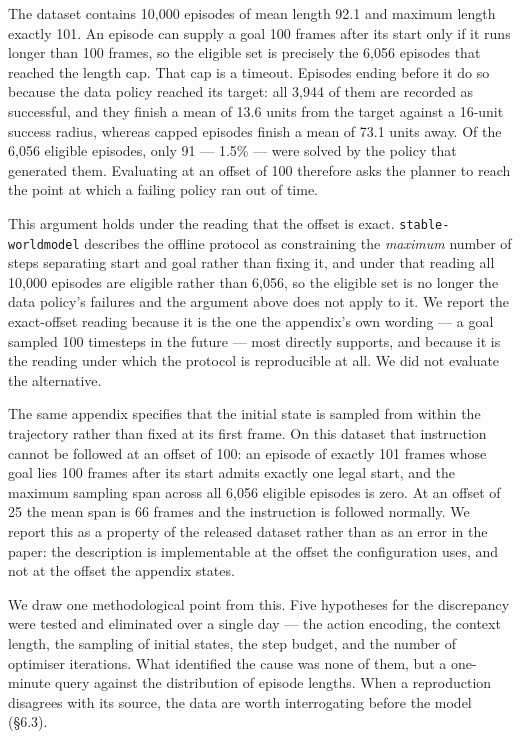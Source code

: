 \documentclass[10pt]{article}
\newcounter{none}
\begin{document}
The dataset contains 10,000 episodes of mean length 92.1 and maximum length
exactly 101. An episode can supply a goal 100 frames after its start only if it
runs longer than 100 frames, so the eligible set is precisely the 6,056
episodes that reached the length cap. That cap is a timeout. Episodes ending
before it do so because the data policy reached its target: all 3,944 of them
are recorded as successful, and they finish a mean of 13.6 units from the
target against a 16-unit success radius, whereas capped episodes finish a mean
of 73.1 units away. Of the 6,056 eligible episodes, only 91 --- 1.5\% --- were
solved by the policy that generated them. Evaluating at an offset of 100 therefore asks the planner to reach the point at which a failing policy ran out of time.

This argument holds under the reading that the offset is exact. \texttt{stable-worldmodel} describes the offline protocol as constraining the \emph{maximum} number of steps separating start and goal rather than fixing it, and under that reading all 10,000 episodes are eligible rather than 6,056, so the eligible set is no longer the data policy's failures and the argument above does not apply to it. We report the exact-offset reading because it is the one the appendix's own wording --- a goal sampled 100 timesteps in the future --- most directly supports, and because it is the reading under which the protocol is reproducible at all. We did not evaluate the alternative.

The same appendix specifies that the initial state is sampled from within the
trajectory rather than fixed at its first frame. On this dataset that
instruction cannot be followed at an offset of 100: an episode of exactly 101
frames whose goal lies 100 frames after its start admits exactly one legal
start, and the maximum sampling span across all 6,056 eligible episodes is
zero. At an offset of 25 the mean span is 66 frames and the instruction is
followed normally. We report this as a property of the released dataset rather
than as an error in the paper: the description is implementable at the offset
the configuration uses, and not at the offset the appendix states.

We draw one methodological point from this. Five hypotheses for the discrepancy
were tested and eliminated over a single day --- the action encoding, the context
length, the sampling of initial states, the step budget, and the number of
optimiser iterations. What identified the cause was none of them, but a
one-minute query against the distribution of episode lengths. When a
reproduction disagrees with its source, the data are worth interrogating before
the model (\S{}6.3).
\end{document}
